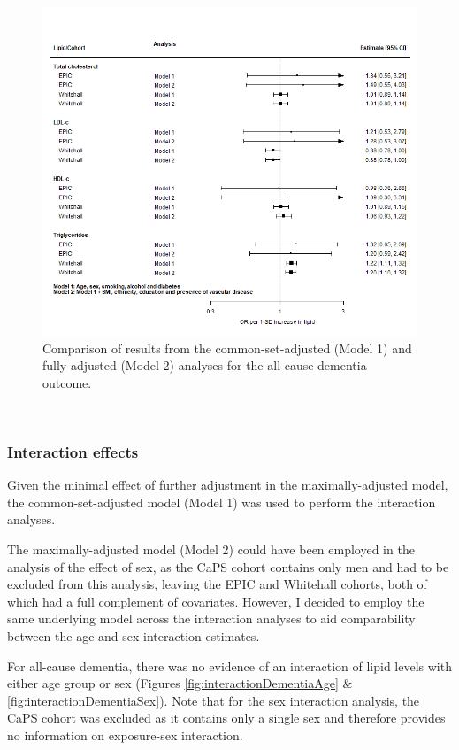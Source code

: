 \documentclass[a4paper, twoside]{templates/ociamthesis}
\begin{document}
\begin{figure}[H]
\includegraphics[width=1\linewidth]{figures/ipd/main_model_comparison} \caption[Comparison of partially and maximally adjusted results]{Comparison of results from the common-set-adjusted (Model 1) and fully-adjusted (Model 2) analyses for the all-cause dementia outcome.}\label{fig:ipdModelComparison}
\end{figure}

~

\hypertarget{interaction-effects}{%
\subsubsection{Interaction effects}\label{interaction-effects}}

Given the minimal effect of further adjustment in the maximally-adjusted model, the common-set-adjusted model (Model 1) was used to perform the interaction analyses.

The maximally-adjusted model (Model 2) could have been employed in the analysis of the effect of sex, as the CaPS cohort contains only men and had to be excluded from this analysis, leaving the EPIC and Whitehall cohorts, both of which had a full complement of covariates. However, I decided to employ the same underlying model across the interaction analyses to aid comparability between the age and sex interaction estimates.

For all-cause dementia, there was no evidence of an interaction of lipid levels with either age group or sex (Figures \ref{fig:interactionDementiaAge} \& \ref{fig:interactionDementiaSex}). Note that for the sex interaction analysis, the CaPS cohort was excluded as it contains only a single sex and therefore provides no information on exposure-sex interaction.
\end{document}
